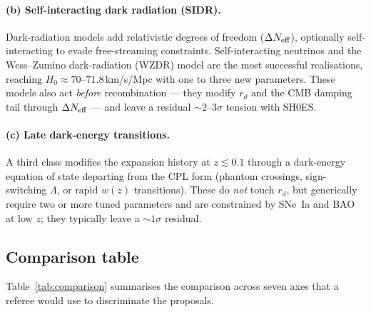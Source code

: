 \documentclass[12pt,a4paper]{article}
\begin{document}
\paragraph{(b) Self-interacting dark radiation (SIDR).}
Dark-radiation models add relativistic degrees of freedom ($\Delta N_{\rm eff}$),
optionally self-interacting to evade free-streaming constraints.
Self-interacting neutrinos \citep{Kreisch2020} and the Wess--Zumino dark-radiation
(WZDR) model \citep{Aloni2022} are the most successful realisations, reaching
$H_0 \approx 70$--$71.8$\,km/s/Mpc with one to three new parameters.
These models also act \emph{before} recombination --- they modify $r_d$ and the
CMB damping tail through $\Delta N_{\rm eff}$ --- and leave a residual
$\sim 2$--$3\sigma$ tension with SH0ES.

\paragraph{(c) Late dark-energy transitions.}
A third class modifies the expansion history at $z \lesssim 0.1$ through a
dark-energy equation of state departing from the CPL form (phantom crossings,
sign-switching $\Lambda$, or rapid $w(z)$ transitions).  These do \emph{not}
touch $r_d$, but generically require two or more tuned parameters and are
constrained by SNe~Ia and BAO at low $z$; they typically leave a $\sim 1\sigma$
residual.

\subsection{Comparison table}
\label{sec:comptable}

Table~\ref{tab:comparison} summarises the comparison across seven axes that a
referee would use to discriminate the proposals.
\end{document}
